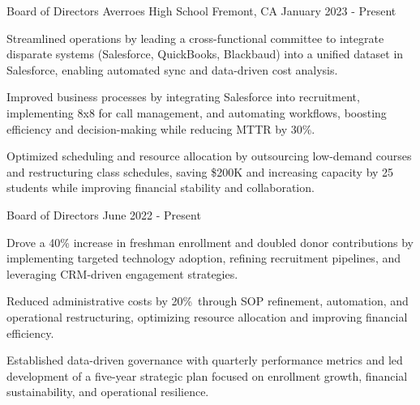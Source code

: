 
\renewcommand{\baselinestretch}{1.4} 
\begin{cventries}

\cventry
{Board of Directors} %
{Averroes High School} %
{Fremont, CA} %
{January 2023 - Present} %
{
  \begin{cvitems} %
    \item {Streamlined operations by leading a cross-functional committee to integrate disparate systems (Salesforce, QuickBooks, Blackbaud) into a unified dataset in Salesforce, enabling automated sync and data-driven cost analysis.}
    \item {Improved business processes by integrating Salesforce into recruitment, implementing 8x8 for call management, and automating workflows, boosting efficiency and decision-making while reducing MTTR by 30\%.}
    \item {Optimized scheduling and resource allocation by outsourcing low-demand courses and restructuring class schedules, saving \$200K and increasing capacity by 25 students while improving financial stability and collaboration.}
  \end{cvitems}
}
  \cventry
  {Board of Directors} %
  {} %
  {} %
  {June 2022 - Present} %
  {
    \begin{cvitems} %
      \item {Drove a 40\% increase in freshman enrollment and doubled donor contributions by implementing targeted technology adoption, refining recruitment pipelines, and leveraging CRM-driven engagement strategies.}
      \item {Reduced administrative costs by 20\% through SOP refinement, automation, and operational restructuring, optimizing resource allocation and improving financial efficiency.}
      \item {Established data-driven governance with quarterly performance metrics and led development of a five-year strategic plan focused on enrollment growth, financial sustainability, and operational resilience.}
          \end{cvitems}
  }


\end{cventries}

